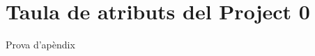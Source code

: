 \chapter{Taula de atributs del Project 0}

Prova d'apèndix

\begin{table}[h!]
	\begin{center}
		\tiny
	\end{center}
\end{table}

